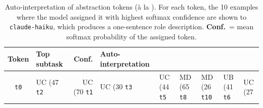 \begin{table}[h]
  \centering\small
  \begin{tabular}{clrp{5.5cm}}
    \toprule
    Token & Top subtask & Conf. & Auto-interpretation \\
    \midrule
    \texttt{t0} & UC (47%
    \texttt{t2} & UC (70%
    \texttt{t1} & UC (30%
    \texttt{t3} & UC (44%
    \texttt{t5} & MD (65%
    \texttt{t8} & MD (26%
    \texttt{t10} & UB (41%
    \texttt{t6} & UC (27%
    \bottomrule
  \end{tabular}
  \caption{Auto-interpretation of \sorl{} abstraction tokens (\`{a} la \citealt{bills2023language}). For each token, the 10 examples where the model assigned it with highest softmax confidence are shown to \texttt{claude-haiku}, which produces a one-sentence role description. \textbf{Conf.}\ = mean softmax probability of the assigned token.}
  \label{tab:auto-interp}
\end{table}